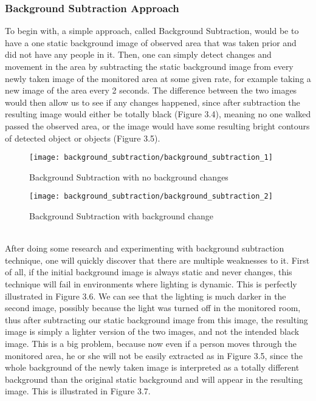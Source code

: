 	\subsubsection{Background Subtraction Approach}
	To begin with, a simple approach, called Background Subtraction, would be to have a one static background image of observed area that was taken prior and did not have any people in it. Then, one can simply detect changes and movement in the area by subtracting the static background image from every newly taken image of the monitored area at some given rate, for example taking a new image of the area every 2 seconds. The difference between the two images would then allow us to see if any changes happened, since after subtraction the resulting image would either be totally black (Figure 3.4), meaning no one walked passed the observed area, or the image would have some resulting bright contours of detected object or objects (Figure 3.5).
	\begin{figure}[ht]
		\begin{center}
		\texttt{[image: background\_subtraction/background\_subtraction\_1]}
		\caption{Background Subtraction with no background changes}
		\end{center}
	\end{figure}
	\begin{figure}[ht]
		\begin{center}
		\texttt{[image: background\_subtraction/background\_subtraction\_2]}
		\caption{Background Subtraction with background change}
		\end{center}
	\end{figure}
	\\After doing some research and experimenting with background subtraction technique, one will quickly discover that there are multiple weaknesses to it. First of all, if the initial background image is always static and never changes, this technique will fail in environments where lighting is dynamic. This is perfectly illustrated in Figure 3.6. We can see that the lighting is much darker in the second image, possibly because the light was turned off in the monitored room, thus after subtracting our static background image from this image, the resulting image is simply a lighter version of the two images, and not the intended black image. This is a big problem, because now even if a person moves through the monitored area, he or she will not be easily extracted as in Figure 3.5, since the whole background of the newly taken image is interpreted as a totally different background than the original static background and will appear in the resulting image. This is illustrated in Figure 3.7. 
